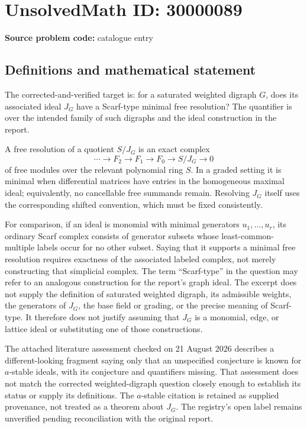 \documentclass[11pt]{article}
\begin{document}
\section*{UnsolvedMath ID: 30000089}
\textbf{Source problem code:} catalogue entry
\subsection{Definitions and mathematical statement}
The corrected-and-verified target is: for a saturated weighted digraph $G$, does its associated ideal $J_G$ have a Scarf-type minimal free resolution? The quantifier is over the intended family of such digraphs and the ideal construction in the report.

A free resolution of a quotient $S/J_G$ is an exact complex
\[
 \cdots\longrightarrow F_2\longrightarrow F_1\longrightarrow F_0
 \longrightarrow S/J_G\longrightarrow0
\]
of free modules over the relevant polynomial ring $S$. In a graded setting it is minimal when differential matrices have entries in the homogeneous maximal ideal; equivalently, no cancellable free summands remain. Resolving $J_G$ itself uses the corresponding shifted convention, which must be fixed consistently.

For comparison, if an ideal is monomial with minimal generators $u_1,\ldots,u_r$, its ordinary Scarf complex consists of generator subsets whose least-common-multiple labels occur for no other subset. Saying that it supports a minimal free resolution requires exactness of the associated labeled complex, not merely constructing that simplicial complex. The term ``Scarf-type'' in the question may refer to an analogous construction for the report's graph ideal. The excerpt does not supply the definition of saturated weighted digraph, its admissible weights, the generators of $J_G$, the base field or grading, or the precise meaning of Scarf-type. It therefore does not justify assuming that $J_G$ is a monomial, edge, or lattice ideal or substituting one of those constructions.

The attached literature assessment checked on 21 August 2026 describes a different-looking fragment saying only that an unspecified conjecture is known for $a$-stable ideals, with its conjecture and quantifiers missing. That assessment does not match the corrected weighted-digraph question closely enough to establish its status or supply its definitions. The $a$-stable citation is retained as supplied provenance, not treated as a theorem about $J_G$. The registry's open label remains unverified pending reconciliation with the original report.
\end{document}
